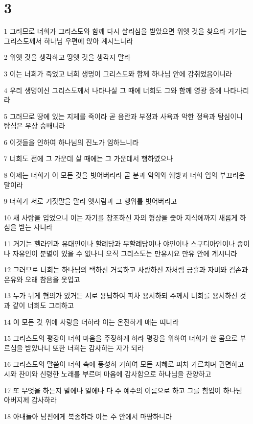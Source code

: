 \chapter{3}

\par 1 그러므로 너희가 그리스도와 함께 다시 살리심을 받았으면 위엣 것을 찾으라 거기는 그리스도께서 하나님 우편에 앉아 계시느니라
\par 2 위엣 것을 생각하고 땅엣 것을 생각지 말라
\par 3 이는 너희가 죽었고 너희 생명이 그리스도와 함께 하나님 안에 감취었음이니라
\par 4 우리 생명이신 그리스도께서 나타나실 그 때에 너희도 그와 함께 영광 중에 나타나리라
\par 5 그러므로 땅에 있는 지체를 죽이라 곧 음란과 부정과 사욕과 악한 정욕과 탐심이니 탐심은 우상 숭배니라
\par 6 이것들을 인하여 하나님의 진노가 임하느니라
\par 7 너희도 전에 그 가운데 살 때에는 그 가운데서 행하였으나
\par 8 이제는 너희가 이 모든 것을 벗어버리라 곧 분과 악의와 훼방과 너희 입의 부끄러운 말이라
\par 9 너희가 서로 거짓말을 말라 옛사람과 그 행위를 벗어버리고
\par 10 새 사람을 입었으니 이는 자기를 창조하신 자의 형상을 좇아 지식에까지 새롭게 하심을 받는 자니라
\par 11 거기는 헬라인과 유대인이나 할례당과 무할례당이나 야인이나 스구디아인이나 종이나 자유인이 분별이 있을 수 없나니 오직 그리스도는 만유시요 만유 안에 계시니라
\par 12 그러므로 너희는 하나님의 택하신 거룩하고 사랑하신 자처럼 긍휼과 자비와 겸손과 온유와 오래 참음을 옷입고
\par 13 누가 뉘게 혐의가 있거든 서로 용납하여 피차 용서하되 주께서 너희를 용서하신 것과 같이 너희도 그리하고
\par 14 이 모든 것 위에 사랑을 더하라 이는 온전하게 매는 띠니라
\par 15 그리스도의 평강이 너희 마음을 주장하게 하라 평강을 위하여 너희가 한 몸으로 부르심을 받았나니 또한 너희는 감사하는 자가 되라
\par 16 그리스도의 말씀이 너희 속에 풍성히 거하여 모든 지혜로 피차 가르치며 권면하고 시와 찬미와 신령한 노래를 부르며 마음에 감사함으로 하나님을 찬양하고
\par 17 또 무엇을 하든지 말에나 일에나 다 주 예수의 이름으로 하고 그를 힘입어 하나님 아버지께 감사하라
\par 18 아내들아 남편에게 복종하라 이는 주 안에서 마땅하니라
